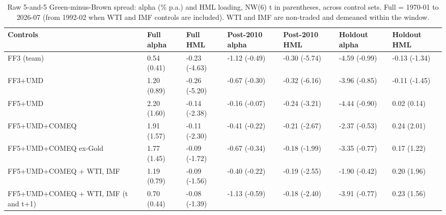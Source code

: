 \begin{table}
\caption{Raw 5-and-5 Green-minus-Brown spread: alpha (\% p.a.) and HML loading, NW(6) t in parentheses, across control sets. Full = 1970-01 to 2026-07 (from 1992-02 when WTI and IMF controls are included). WTI and IMF are non-traded and demeaned within the window.}
\label{tab:m2_spread_controls}
\begin{tabular}{lllllll}
\toprule
Controls & Full alpha & Full HML & Post-2010 alpha & Post-2010 HML & Holdout alpha & Holdout HML \\
\midrule
FF3 (team) & 0.54 (0.41) & -0.23 (-4.63) & -1.12 (-0.49) & -0.30 (-5.74) & -4.59 (-0.99) & -0.13 (-1.34) \\
FF3+UMD & 1.20 (0.89) & -0.26 (-5.20) & -0.67 (-0.30) & -0.32 (-6.16) & -3.96 (-0.85) & -0.11 (-1.45) \\
FF5+UMD & 2.20 (1.60) & -0.14 (-2.38) & -0.16 (-0.07) & -0.24 (-3.21) & -4.44 (-0.90) & 0.02 (0.14) \\
FF5+UMD+COMEQ & 1.91 (1.57) & -0.11 (-2.30) & -0.41 (-0.22) & -0.21 (-2.67) & -2.37 (-0.53) & 0.24 (2.01) \\
FF5+UMD+COMEQ ex-Gold & 1.77 (1.45) & -0.09 (-1.72) & -0.67 (-0.34) & -0.18 (-1.99) & -3.35 (-0.77) & 0.17 (1.22) \\
FF5+UMD+COMEQ + WTI, IMF & 1.19 (0.79) & -0.09 (-1.56) & -0.40 (-0.22) & -0.19 (-2.55) & -1.90 (-0.42) & 0.20 (1.96) \\
FF5+UMD+COMEQ + WTI, IMF (t and t+1) & 0.70 (0.44) & -0.08 (-1.39) & -1.13 (-0.59) & -0.18 (-2.40) & -3.91 (-0.77) & 0.23 (1.56) \\
\bottomrule
\end{tabular}
\end{table}
